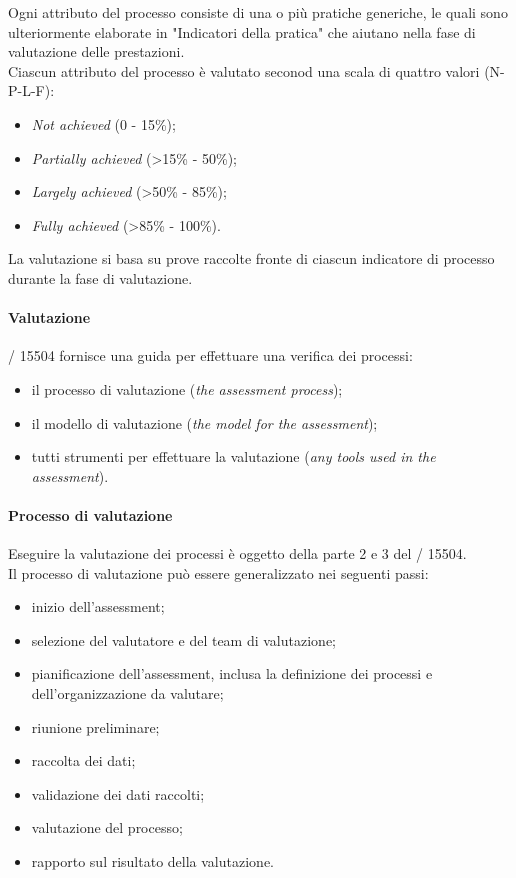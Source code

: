   Ogni attributo del processo consiste di una o più pratiche generiche, le quali sono ulteriormente elaborate in "Indicatori della pratica" che aiutano nella fase di valutazione delle prestazioni.
  \\Ciascun attributo del processo è valutato seconod una scala di quattro valori (N-P-L-F):
  \begin{itemize}
    \item \emph{Not achieved} (0 - 15\%);
    \item \emph{Partially achieved} (>15\% - 50\%);
    \item \emph{Largely achieved} (>50\% - 85\%);
    \item \emph{Fully achieved} (>85\% - 100\%).
  \end{itemize}
  La valutazione si basa su prove raccolte fronte di ciascun indicatore di processo durante la fase di valutazione.

  \paragraph{Valutazione}
  / 15504 fornisce una guida per effettuare una verifica dei processi:
  \begin{itemize}
    \item il processo di valutazione (\emph{the assessment process});
    \item il modello di valutazione (\emph{the model for the assessment});
    \item tutti strumenti per effettuare la valutazione (\emph{any tools used in the assessment}).
  \end{itemize}
  \paragraph{Processo di valutazione}
  Eseguire la valutazione dei processi è oggetto della parte 2 e 3 del / 15504.\\
  Il processo di valutazione può essere generalizzato nei seguenti passi:
  \begin{itemize}
    \item inizio dell'assessment;
    \item selezione del valutatore e del team di valutazione;
    \item pianificazione dell'assessment, inclusa la definizione dei processi e dell'organizzazione da valutare;
    \item riunione preliminare;
    \item raccolta dei dati;
    \item validazione dei dati raccolti;
    \item valutazione del processo;
    \item rapporto sul risultato della valutazione.
  \end{itemize}

